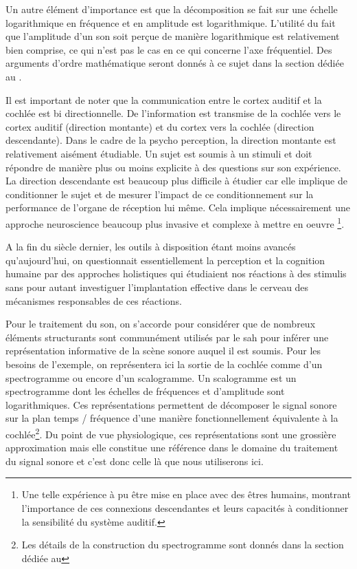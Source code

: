   Un autre élément d'importance est que la décomposition se fait sur une échelle logarithmique en fréquence et  en amplitude est logarithmique. L'utilité du fait que l'amplitude d'un son soit perçue de manière logarithmique est relativement bien comprise, ce qui n'est pas le cas en ce qui concerne l'axe fréquentiel. Des arguments d'ordre mathématique seront donnés à ce sujet dans la section dédiée au .

  Il est important de noter que la communication entre le cortex auditif et la cochlée est bi directionnelle. De l'information est transmise de la cochlée vers le cortex auditif (direction montante) et du cortex vers la cochlée (direction descendante). Dans le cadre de la psycho perception, la direction montante est relativement aisément étudiable. Un sujet est soumis à un stimuli et doit répondre de manière plus ou moins explicite à des questions sur son expérience. La direction descendante est beaucoup plus difficile à étudier car elle implique de conditionner le sujet et de mesurer l'impact de ce conditionnement sur la performance de l'organe de réception lui même. Cela implique nécessairement une approche \og neuroscience \fg beaucoup plus invasive et complexe à mettre en oeuvre \footnote{Une telle expérience à pu être mise en place avec des êtres humains, montrant l'importance de ces connexions descendantes et leurs capacités à conditionner la sensibilité du système auditif\cite{mesgarani2012selective}.}.

  A la fin du siècle dernier, les outils à disposition étant moins avancés qu'aujourd'hui, on questionnait essentiellement la perception et la cognition humaine par des approches \og holistiques \fg qui étudiaient nos réactions à des stimulis sans pour autant investiguer l'implantation effective dans le cerveau des mécanismes responsables de ces réactions.

  Pour le traitement du son, on s'accorde pour considérer que de nombreux éléments structurants sont communément utilisés par le sah pour inférer une représentation informative de la scène sonore auquel il est soumis. Pour les besoins de l'exemple, on représentera ici la sortie de la cochlée comme d'un spectrogramme ou encore d'un scalogramme. Un scalogramme est un spectrogramme dont les échelles de fréquences et d'amplitude sont logarithmiques. Ces représentations permettent de décomposer le signal sonore sur la plan temps / fréquence d'une manière fonctionnellement équivalente à la cochlée\footnote{Les détails de la construction du spectrogramme sont donnés dans la section dédiée au }. Du point de vue physiologique, ces représentations sont une grossière approximation\cite{lyon2017human} mais elle constitue une référence dans le domaine du traitement du signal sonore et c'est donc celle là que nous utiliserons ici.

